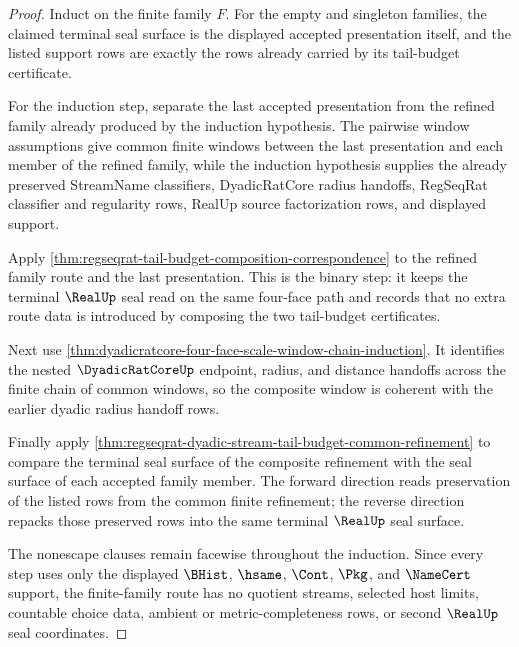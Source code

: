 \begin{proof}
Induct on the finite family $F$. For the empty and singleton families, the
claimed terminal seal surface is the displayed accepted presentation itself,
and the listed support rows are exactly the rows already carried by its
tail-budget certificate.

For the induction step, separate the last accepted presentation from the
refined family already produced by the induction hypothesis. The pairwise
window assumptions give common finite windows between the last presentation
and each member of the refined family, while the induction hypothesis supplies
the already preserved StreamName classifiers, DyadicRatCore radius handoffs,
RegSeqRat classifier and regularity rows, RealUp source factorization rows, and
displayed support.

Apply \autoref{thm:regseqrat-tail-budget-composition-correspondence} to the
refined family route and the last presentation. This is the binary step: it
keeps the terminal $\RealUp$ seal read on the same four-face path and records
that no extra route data is introduced by composing the two tail-budget
certificates.

Next use
\autoref{thm:dyadicratcore-four-face-scale-window-chain-induction}. It
identifies the nested $\DyadicRatCoreUp$ endpoint, radius, and distance
handoffs across the finite chain of common windows, so the composite window is
coherent with the earlier dyadic radius handoff rows.

Finally apply
\autoref{thm:regseqrat-dyadic-stream-tail-budget-common-refinement} to compare
the terminal seal surface of the composite refinement with the seal surface of
each accepted family member. The forward direction reads preservation of the
listed rows from the common finite refinement; the reverse direction repacks
those preserved rows into the same terminal $\RealUp$ seal surface.

The nonescape clauses remain facewise throughout the induction. Since every
step uses only the displayed $\BHist$, $\hsame$, $\Cont$, $\Pkg$, and
$\NameCert$ support, the finite-family route has no quotient streams, selected
host limits, countable choice data, ambient or metric-completeness rows, or
second $\RealUp$ seal coordinates.
\end{proof}

